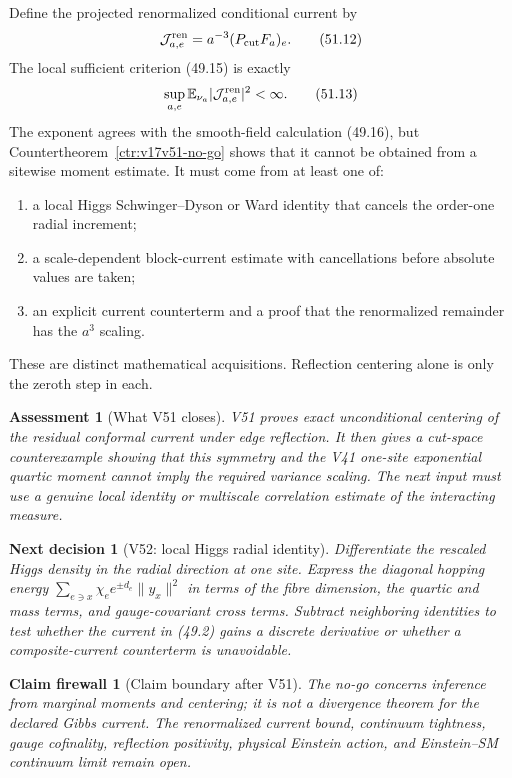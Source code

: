 \documentclass[11pt]{article}
\newtheorem{firewall}[theorem]{Claim firewall}
\newtheorem{decision}[theorem]{Next decision}
\newtheorem{assessment}[theorem]{Assessment}
\theoremstyle{remark}
\begin{document}
Define the projected renormalized conditional current by
\[
 \mathcal J_{a,e}^{\rm ren}
 =
 a^{-3}(P_{\rm cut}F_a)_e.                        \tag{51.12}
\]
The local sufficient criterion (49.15) is exactly
\[
 \sup_{a,e}
 \mathbb E_{\nu_a}
 |\mathcal J_{a,e}^{\rm ren}|^2<\infty.           \tag{51.13}
\]
The exponent agrees with the smooth-field calculation (49.16), but
Countertheorem~\ref{ctr:v17v51-no-go} shows that it cannot be obtained
from a sitewise moment estimate.  It must come from at least one of:
\begin{enumerate}
\item a local Higgs Schwinger--Dyson or Ward identity that cancels the
      order-one radial increment;
\item a scale-dependent block-current estimate with cancellations
      before absolute values are taken;
\item an explicit current counterterm and a proof that the
      renormalized remainder has the \(a^3\) scaling.
\end{enumerate}
These are distinct mathematical acquisitions.  Reflection centering
alone is only the zeroth step in each.

\begin{assessment}[What V51 closes]
\label{ass:v17v51-status}
V51 proves exact unconditional centering of the residual conformal
current under edge reflection.  It then gives a cut-space counterexample
showing that this symmetry and the V41 one-site exponential quartic
moment cannot imply the required variance scaling.  The next input
must use a genuine local identity or multiscale correlation estimate
of the interacting measure.
\end{assessment}

\begin{decision}[V52: local Higgs radial identity]
\label{dec:v17v51-next}
Differentiate the rescaled Higgs density in the radial direction at
one site.  Express the diagonal hopping energy
\(\sum_{e\ni x}\chi_e e^{\pm d_e}\|y_x\|^2\) in terms of the fibre
dimension, the quartic and mass terms, and gauge-covariant cross
terms.  Subtract neighboring identities to test whether the current
in (49.2) gains a discrete derivative or whether a composite-current
counterterm is unavoidable.
\end{decision}

\begin{firewall}[Claim boundary after V51]
\label{fire:v17v51}
The no-go concerns inference from marginal moments and centering; it
is not a divergence theorem for the declared Gibbs current.  The
renormalized current bound, continuum tightness, gauge cofinality,
reflection positivity, physical Einstein action, and Einstein--SM
continuum limit remain open.
\end{firewall}
\end{document}
